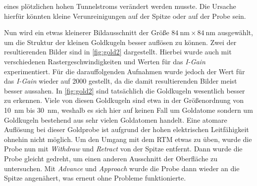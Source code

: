 eines plötzlichen hohen Tunnelstroms verändert werden musste. Die Ursache hierfür könnten kleine Verunreinigungen auf der Spitze oder auf der Probe sein.\par
Nun wird ein etwas kleinerer Bildausschnitt der Größe $\SI{84}{\nano \meter} \times \SI{84}{\nano \meter}$ ausgewählt, um die Struktur der kleinen Goldkugeln
besser auflösen zu können. Zwei der resultierenden Bilder sind in \cref{fig:gold2} dargestellt. Hierbei wurde auch mit verschiedenen Rastergeschwindigkeiten
und Werten für das \textit{I-Gain} experimentiert. Für die darauffolgenden Aufnahmen wurde jedoch der Wert für das \textit{I-Gain} wieder auf \num{2000} gestellt, da
die damit resultierenden Bilder meist besser aussahen. In \cref{fig:gold2} sind tatsächlich die Goldkugeln wesentlich besser zu erkennen. Viele von diesen
Goldkugeln sind etwa in der Größenordnung von \SI{10}{\nano \meter} bis \SI{30}{\nano \meter}, weshalb es sich hier auf keinen Fall um Goldatome sondern um Goldkugeln bestehend aus sehr
vielen Goldatomen handelt. Eine atomare Auflösung bei dieser Goldprobe ist aufgrund der hohen elektrischen Leitfähigkeit ohnehin nicht möglich. Um den Umgang
mit dem RTM etwas zu üben, wurde die Probe nun mit \textit{Withdraw} und \textit{Retract} von der Spitze entfernt. Dann wurde die Probe gleicht gedreht, um
einen anderen Ausschnitt der Oberfläche zu untersuchen. Mit \textit{Advance} und \textit{Approach} wurde die Probe dann wieder an die Spitze angenähert, was
erneut ohne Probleme funktionierte.
